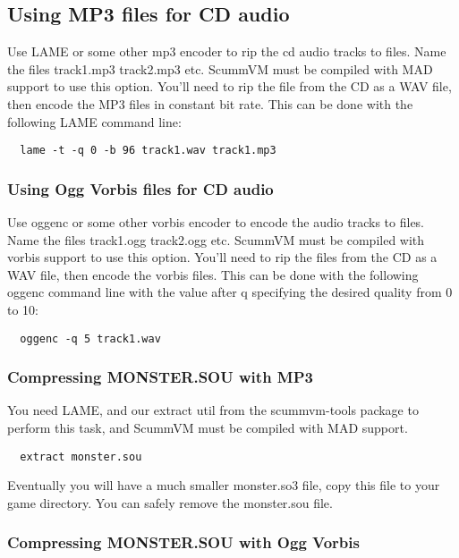 

\subsection{Using MP3 files for CD audio}

Use LAME or some other mp3 encoder to rip the cd audio tracks to files. Name
the files track1.mp3 track2.mp3 etc. ScummVM must be compiled with MAD support
to use this option. You'll need to rip the file from the CD as a WAV file,
then encode the MP3 files in constant bit rate. This can be done with the 
following LAME command line:
\begin{verbatim}
  lame -t -q 0 -b 96 track1.wav track1.mp3
\end{verbatim}


\subsubsection{Using Ogg Vorbis files for CD audio}

Use oggenc or some other vorbis encoder to encode the audio tracks to files.
Name the files track1.ogg track2.ogg etc. ScummVM must be compiled with vorbis
support to use this option. You'll need to rip the files from the CD as a WAV
file, then encode the vorbis files. This can be done with the following oggenc
command line with the value after q specifying the desired quality from 0 to 10:
\begin{verbatim}
  oggenc -q 5 track1.wav
\end{verbatim}


\subsubsection{Compressing MONSTER.SOU with MP3}

You need LAME, and our extract util from the scummvm-tools package to perform
this task, and ScummVM must be compiled with MAD support.
\begin{verbatim}
  extract monster.sou
\end{verbatim}
%
Eventually you will have a much smaller monster.so3 file, copy this file
to your game directory. You can safely remove the monster.sou file.


\subsubsection{Compressing MONSTER.SOU with Ogg Vorbis}

